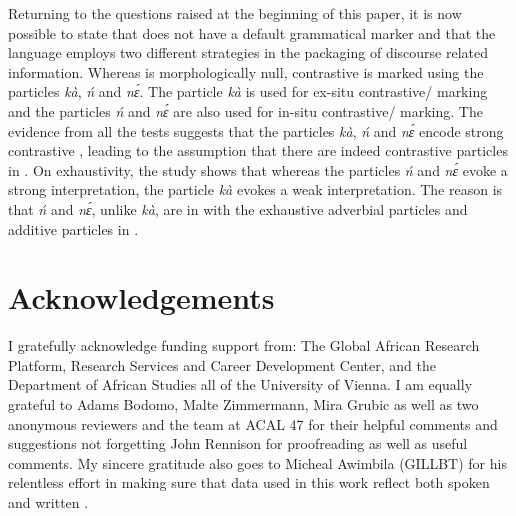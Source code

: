 \documentclass[output=paper,modfonts,nonflat,
\ChapterDOI{10.5281/zenodo.3367154}
 hidelinks
]{langsci/langscibook}
\begin{document}
Returning to the questions raised at the beginning of this paper, it is now possible to state that  does not have a default grammatical  marker and that the language employs two different strategies in the packaging of discourse related information. Whereas  is morphologically null, contrastive  is marked using the particles \textit{kà}, \textit{ń} and \textit{nɛ́}. The particle \textit{kà} is used for ex-situ contrastive{\slash} marking and the particles \textit{ń} and \textit{nɛ́} are also used for in-situ contrastive{\slash} marking. The evidence from all the tests suggests that the particles \textit{kà}, \textit{ń} and \textit{nɛ́} encode strong contrastive , leading to the assumption that there are indeed contrastive  particles in . On exhaustivity, the study shows that whereas the particles \textit{ń} and \textit{nɛ́} evoke a strong  interpretation, the particle \textit{kà} evokes a weak  interpretation.  The reason is that \textit{ń} and \textit{nɛ́}, unlike \textit{kà}, are in  with the exhaustive adverbial particles and additive particles in . 

\section*{Acknowledgements}
I gratefully acknowledge funding support from: The Global African Research Platform, Research Services and Career Development Center, and the Department of African Studies all of the University of Vienna. I am equally grateful to Adams Bodomo, Malte Zimmermann, Mira Grubic as well as two anonymous reviewers and the team at ACAL 47 for their helpful comments and suggestions not forgetting John Rennison for proofreading as well as useful comments. My sincere gratitude also goes to Micheal Awimbila (GILLBT) for his relentless effort in making sure that data used in this work reflect both spoken and written .                                      
\end{document}

